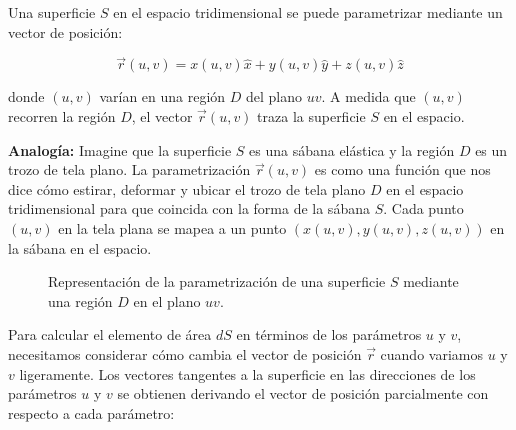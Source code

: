 \documentclass{article}
\begin{document}
Una superficie $S$ en el espacio tridimensional se puede parametrizar mediante un vector de posición:

\[
\vec{r}(u,v) = x(u,v)\hat{x} + y(u,v)\hat{y} + z(u,v)\hat{z}
\]

donde $(u,v)$ varían en una región $D$ del plano $uv$. A medida que $(u,v)$ recorren la región $D$, el vector $\vec{r}(u,v)$ traza la superficie $S$ en el espacio.

\textbf{Analogía:} Imagine que la superficie $S$ es una sábana elástica y la región $D$ es un trozo de tela plano. La parametrización $\vec{r}(u, v)$ es como una función que nos dice cómo estirar, deformar y ubicar el trozo de tela plano $D$ en el espacio tridimensional para que coincida con la forma de la sábana $S$. Cada punto $(u, v)$ en la tela plana se mapea a un punto $(x(u,v), y(u,v), z(u,v))$ en la sábana en el espacio.
\begin{figure}[h]
    \centering
    \caption{Representación de la parametrización de una superficie $S$ mediante una región $D$ en el plano $uv$.}
    \label{fig:parametrizacion}
\end{figure}
Para calcular el elemento de área $dS$ en términos de los parámetros $u$ y $v$, necesitamos considerar cómo cambia el vector de posición $\vec{r}$ cuando variamos $u$ y $v$ ligeramente. Los vectores tangentes a la superficie en las direcciones de los parámetros $u$ y $v$ se obtienen derivando el vector de posición parcialmente con respecto a cada parámetro:
\end{document}
